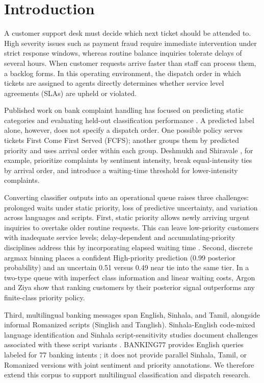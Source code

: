 \section{Introduction}
\label{sec:intro}

A customer support desk must decide which next ticket should be attended to. High severity issues such as payment fraud require immediate intervention under strict response windows,  whereas routine balance inquiries tolerate delays of several hours. When customer requests arrive faster than staff can process them, a backlog forms. In this operating environment, the dispatch order in which tickets are assigned to agents directly determines whether service level agreements (SLAs) are upheld or violated.

Published work on bank complaint handling has focused on predicting static categories and evaluating held-out classification performance \cite{arya2026bank}. A predicted label alone, however, does not specify a dispatch order. One possible policy serves tickets First Come First Served (FCFS); another groups them by predicted priority and uses arrival order within each group. Deshmukh and Shiravale \cite{deshmukh2020priority}, for example, prioritize complaints by sentiment intensity, break equal-intensity ties by arrival order, and introduce a waiting-time threshold for lower-intensity complaints.

Converting classifier outputs into an operational queue raises three challenges: prolonged waits under static priority, loss of predictive uncertainty, and variation across languages and scripts. First, static priority allows newly arriving urgent inquiries to overtake older routine requests. This can leave low-priority customers with inadequate service levels; delay-dependent and accumulating-priority disciplines address this by incorporating elapsed waiting time \cite{kleinrock1964delay,stanford2014accumulating}. Second, discrete argmax binning places a confident High-priority prediction (0.99 posterior probability) and an uncertain 0.51 versus 0.49 near tie into the same tier. In a two-type queue with imperfect class information and linear waiting costs, Argon and Ziya \cite{argon2009priority} show that ranking customers by their posterior signal outperforms any finite-class priority policy.

Third, multilingual banking messages span English, Sinhala, and Tamil, alongside informal Romanized scripts (Singlish and Tanglish). Sinhala-English code-mixed language identification and Sinhala script-sensitivity studies document challenges associated with these script variants \cite{smith2020codemixed,rajapakse2026script}. BANKING77 provides English queries labeled for 77 banking intents \cite{casanueva2020banking77}; it does not provide parallel Sinhala, Tamil, or Romanized versions with joint sentiment and priority annotations. We therefore extend this corpus to support multilingual classification and dispatch research.

